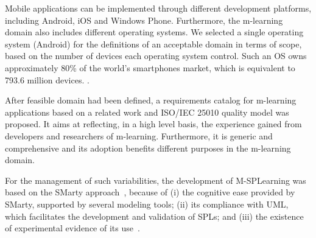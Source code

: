 Mobile applications can be implemented through different development platforms, including Android, iOS and Windows Phone. Furthermore, the m-learning domain also includes different operating systems. We selected a single operating system (Android) for the definitions of an acceptable domain in terms of scope, based on the number of devices each operating system control. Such an OS owns approximately 80\% of the world's smartphones market, which is equivalent to 793.6 million devices. \cite{llamas14}.

After feasible domain had been defined, a requirements catalog for m-learning applications based on a related work \cite{filho13} and ISO/IEC 25010 quality model was proposed. It aims at reflecting, in a high level basis, the experience gained from developers and researchers of m-learning. Furthermore, it is generic and comprehensive and its adoption benefits different purposes in the m-learning domain. 

For the management of such variabilities, the development of M-SPLear\allowbreak ning was based on the SMarty approach~\cite{oliveirajr10}, because of (i) the cognitive ease provided by SMarty, supported by several modeling tools; (ii) its compliance with UML, which facilitates the development and validation of SPLs; and (iii) the existence of experimental evidence of its use~\cite{marcolino13,marcolino14a,marcolino14b,bera15}. 

